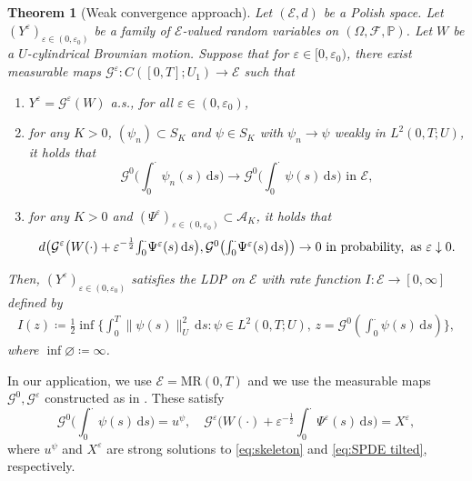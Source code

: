 \documentclass{amsart}
\newcommand{\dd}{\,\mathrm{d}}
\renewcommand{\MR}{\mathrm{MR}}
\newcommand{\<}{\langle}
\newcommand{\?}{\rangle}
\newcommand{\col}{\colon}
\theoremstyle{plain}
\newtheorem{theorem}{Theorem}[section]
\theoremstyle{remark}
\theoremstyle{plain}
\numberwithin{equation}{section}
\newcommand{\F}{\mathcal{F}}
\newcommand{\G}{\mathcal{G}}
\renewcommand{\P}{\mathbb{P}}
\newcommand{\eps}{\varepsilon}
\begin{document}
\begin{theorem}[Weak convergence approach]\label{th: sufficient LDP criterion}
Let $(\mathcal E,d)$ be a Polish space. Let $(Y^\eps)_{\eps\in(0,\eps_0)}$ be a family of $\mathcal{E}$-valued random variables on $(\Omega,\F,\P)$.
Let $W$ be a  $U$-cylindrical Brownian motion.  
Suppose that for $\eps\in[0,\eps_0)$, there exist measurable maps $\G^\eps\colon C([0,T];U_1)\to\mathcal{E}$ such that
\begin{enumerate}[label=\emph{(\roman*)},ref=\textup{(\roman*)}]
\item \label{it:suf1} $Y^\eps=\G^\eps(W)$ a.s., for all $\eps\in(0,\eps_0)$,
  \item \label{it:suf2} for any $K>0$,  $(\psi_n)\subset S_K$ and $\psi\in S_K$ with $\psi_n\to \psi$ weakly in $L^2(0,T;U)$, it holds that
  \[
  \G^0\big(\textstyle{\int_0^{\cdot}} \psi_n(s)\dd s\big)\to\G^0\big(\textstyle{\int_0^{\cdot}} \psi(s)\dd s\big) \text{ in } \mathcal{E},
  \]
  \item \label{it:suf3} for any $K>0$ and $(\Psi^\eps)_{\eps\in(0,\eps_0)}\subset \mathcal{A}_K$, it holds that
  \[
  d\big(\G^\eps\big(W(\cdot)+\eps^{-\frac12}\textstyle{\int_0^{\cdot}} \Psi^\eps(s)\dd s\big),\G^0\big(\textstyle{\int_0^{\cdot}} \Psi^\eps(s)\dd s\big)\big)\to 0 \text{ in probability,\, as }\eps\downarrow 0.
  \] 
\end{enumerate}
Then, $(Y^\eps)_{\eps\in(0,\eps_0)}$ satisfies the LDP on $\mathcal{E}$ with   rate function $I\col \mathcal{E}\to [0,\infty]$ defined by
\begin{align*}
I(z)\coloneqq \tfrac12\inf\big\{\textstyle{\int_0^{T}}\|\psi(s)\|_U^2\dd s : \psi\in L^2(0,T;U),\, z=\G^0(\textstyle{\int_0^{\cdot}} \psi(s)\dd s)\big\},
\end{align*}
where $\inf\varnothing\coloneqq \infty$. 
\end{theorem}
In our application, we use $\mathcal{E}=\MR(0,T)$ and we use the measurable maps $\G^0,\G^\eps$  constructed as in
\cite[(4.4), Lem.\ 4.6]{TV24}. These satisfy   $$\G^0\big(\textstyle{\int_0^\cdot} \psi(s)\dd s\big)=u^\psi, \quad\G^\eps\big(W(\cdot)+\eps^{-\frac12}\textstyle{\int_0^{\cdot}} \Psi^\eps(s)\dd s\big)=X^\eps,$$  where $u^\psi$ and $X^\eps$ are strong solutions  to \eqref{eq:skeleton} and \eqref{eq:SPDE tilted}, respectively.  
\end{document}
